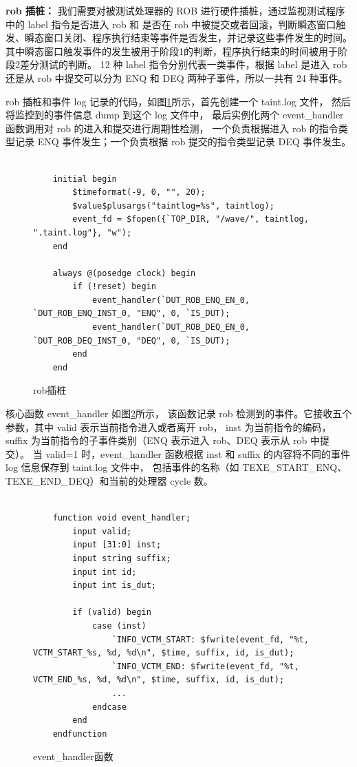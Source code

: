 \textbf{rob 插桩：}
我们需要对被测试处理器的 ROB 进行硬件插桩，通过监视测试程序中的 label 指令是否进入 rob 和
是否在 rob 中被提交或者回滚，判断瞬态窗口触发、瞬态窗口关闭、程序执行结束等事件是否发生，并记录这些事件发生的时间。
其中瞬态窗口触发事件的发生被用于阶段1的判断，程序执行结束的时间被用于阶段2差分测试的判断。
12 种 label 指令分别代表一类事件，根据 label 是进入 rob 还是从 rob 中提交可以分为 ENQ 和 DEQ 两种子事件，所以一共有 24 种事件。\par

rob 插桩和事件 log 记录的代码，如图\ref{code:rob-stub}所示，首先创建一个 taint.log 文件，
然后将监控到的事件信息 dump 到这个 log 文件中，
最后实例化两个 event\_handler 函数调用对 rob 的进入和提交进行周期性检测，
一个负责根据进入 rob 的指令类型记录 ENQ 事件发生；一个负责根据 rob 提交的指令类型记录 DEQ 事件发生。

\begin{figure}[htbp]
    \centering
    \begin{verbatim}

    initial begin
        $timeformat(-9, 0, "", 20);
        $value$plusargs("taintlog=%s", taintlog);
        event_fd = $fopen({`TOP_DIR, "/wave/", taintlog, ".taint.log"}, "w");
    end

    always @(posedge clock) begin
        if (!reset) begin
            event_handler(`DUT_ROB_ENQ_EN_0, `DUT_ROB_ENQ_INST_0, "ENQ", 0, `IS_DUT);
            event_handler(`DUT_ROB_DEQ_EN_0, `DUT_ROB_DEQ_INST_0, "DEQ", 0, `IS_DUT);
        end
    end

    \end{verbatim}
    \caption{rob插桩}
    \label{code:rob-stub}
\end{figure}

核心函数 event\_handler 如图\ref{code:event-handler}所示，
该函数记录 rob 检测到的事件。它接收五个参数，其中 valid 表示当前指令进入或者离开 rob，
inst 为当前指令的编码，suffix 为当前指令的子事件类别（ENQ 表示进入 rob、DEQ 表示从 rob 中提交）。
当 valid=1 时，event\_handler 函数根据 inst 和 suffix 的内容将不同的事件 log 信息保存到 taint.log 文件中，
包括事件的名称（如 TEXE\_START\_ENQ、TEXE\_END\_DEQ）和当前的处理器 cycle 数。

\begin{figure}[htbp]
    \centering
    \begin{verbatim}

    function void event_handler;
        input valid;
        input [31:0] inst;
        input string suffix;
        input int id;
        input int is_dut;

        if (valid) begin
            case (inst)
                `INFO_VCTM_START: $fwrite(event_fd, "%t, VCTM_START_%s, %d, %d\n", $time, suffix, id, is_dut);
                `INFO_VCTM_END: $fwrite(event_fd, "%t, VCTM_END_%s, %d, %d\n", $time, suffix, id, is_dut);
                ...
            endcase
        end
    endfunction
    \end{verbatim}
    \caption{event\_handler函数}
    \label{code:event-handler}
\end{figure}

